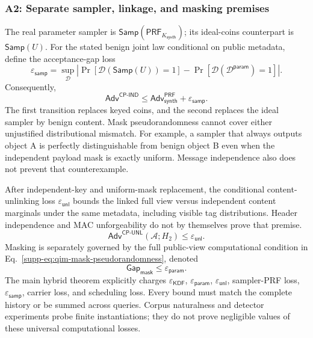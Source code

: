\documentclass[journal]{IEEEtran}
\theoremstyle{definition}
\theoremstyle{game}
\begin{document}
\subsubsection{A2: Separate sampler, linkage, and masking premises}\label{supp-assump:a2}
The real parameter sampler is $\mathsf{Samp}(\mathsf{PRF}_{K_{\mathsf{synth}}})$;
its ideal-coins counterpart is $\mathsf{Samp}(U)$. For the stated benign joint
law conditional on public metadata, define the acceptance-gap loss
\begin{equation}\label{supp-eq:cp-ind-assumption}
\varepsilon_{\mathsf{samp}}=\sup_{\mathcal D}
\left|\Pr[\mathcal D(\mathsf{Samp}(U))=1]-
\Pr[\mathcal D(\mathcal D^{\mathsf{param}})=1]\right|.
\end{equation}
Consequently,
\begin{equation}\label{supp-eq:separate-sampler-bound}
\mathsf{Adv}^{\mathsf{CP\text{-}IND}}
\le\mathsf{Adv}^{\mathsf{PRF}}_{\mathsf{synth}}+\varepsilon_{\mathsf{samp}}.
\end{equation}
The first transition replaces keyed coins, and the second replaces the
ideal sampler by benign content. Mask pseudorandomness cannot cover either
unjustified distributional mismatch. For example, a sampler that always
outputs object A is perfectly distinguishable from benign object B even
when the independent payload mask is exactly uniform. Message independence
also does not prevent that counterexample.

After independent-key and uniform-mask replacement, the conditional
content-unlinking loss $\varepsilon_{\mathsf{unl}}$ bounds
the linked full view versus independent content marginals under the same
metadata, including visible tag distributions. Header independence and
MAC unforgeability do not by themselves prove that premise.
\begin{equation}\label{supp-eq:cp-unl-assumption}
\mathsf{Adv}^{\mathsf{CP\text{-}UNL}}(\mathcal A;H_2)\le\varepsilon_{\mathsf{unl}}.
\end{equation}
Masking is separately governed by the full public-view computational
condition in Eq.~\eqref{supp-eq:qim-mask-pseudorandomness}, denoted
\begin{equation}\label{supp-eq:param-gap}
\mathsf{Gap}_{\mathsf{mask}}\le\varepsilon_{\mathsf{param}}.
\end{equation}
The main hybrid theorem explicitly charges
$\varepsilon_{\mathsf{KDF}}$, $\varepsilon_{\mathsf{param}}$,
$\varepsilon_{\mathsf{unl}}$, sampler-PRF loss, $\varepsilon_{\mathsf{samp}}$,
carrier loss, and scheduling loss. Every bound must match the complete
history or be summed across queries. Corpus naturalness and detector
experiments probe finite instantiations; they do not prove negligible
values of these universal computational losses.
\end{document}
